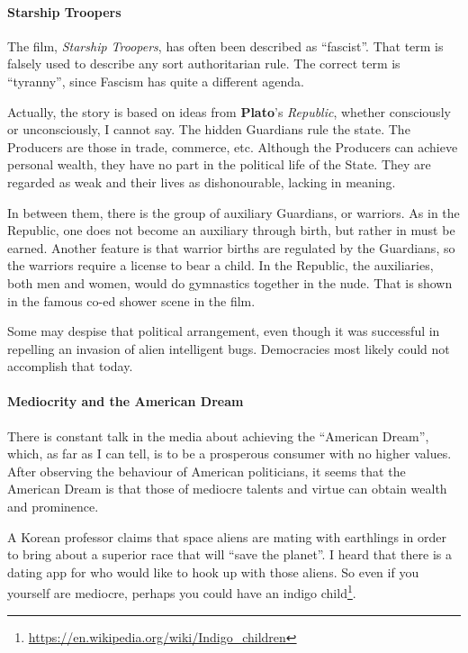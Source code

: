 \paragraph{Starship Troopers}


The film, \emph{Starship Troopers}, has often been described as ``fascist''. That term is falsely used to describe any sort authoritarian rule. The correct term is ``tyranny'', since Fascism has quite a different agenda.

Actually, the story is based on ideas from \textbf{Plato}'s \emph{Republic}, whether consciously or unconsciously, I cannot say. The hidden Guardians rule the state. The Producers are those in trade, commerce, etc. Although the Producers can achieve personal wealth, they have no part in the political life of the State. They are regarded as weak and their lives as dishonourable, lacking in meaning.

In between them, there is the group of auxiliary Guardians, or warriors. As in the Republic, one does not become an auxiliary through birth, but rather in must be earned. Another feature is that warrior births are regulated by the Guardians, so the warriors require a license to bear a child. In the Republic, the auxiliaries, both men and women, would do gymnastics together in the nude. That is shown in the famous co-ed shower scene in the film.

Some may despise that political arrangement, even though it was successful in repelling an invasion of alien intelligent bugs. Democracies most likely could not accomplish that today.

\paragraph{Mediocrity and the American Dream}


There is constant talk in the media about achieving the ``American Dream'', which, as far as I can tell, is to be a prosperous consumer with no higher values. After observing the behaviour of American politicians, it seems that the American Dream is that those of mediocre talents and virtue can obtain wealth and prominence.

A Korean professor claims that space aliens are mating with earthlings in order to bring about a superior race that will ``save the planet''. I heard that there is a dating app for who would like to hook up with those aliens. So even if you yourself are mediocre, perhaps you could have an indigo child\footnote{\url{https://en.wikipedia.org/wiki/Indigo_children}}.


